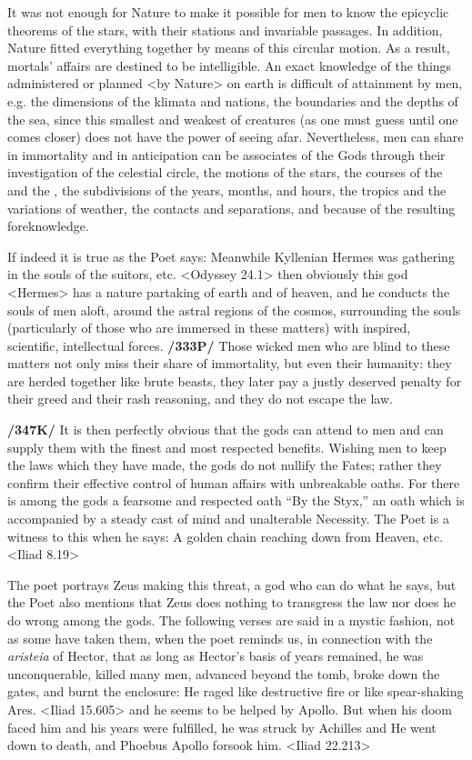 It was not enough for Nature to make it possible for men to know the epicyclic theorems of the stars, with their stations and invariable passages. In addition, Nature fitted everything together by means of this circular motion. As a result, mortals’ affairs are destined to be intelligible. An exact knowledge of the things administered or planned <by Nature> on earth is difficult of attainment by men, e.g. the dimensions of the klimata and nations, the boundaries and the depths of the sea, since this smallest and weakest of creatures (as one must guess until one comes closer) does not have the power of seeing afar. Nevertheless, men can share in immortality and in anticipation can be associates of the Gods through their investigation of the celestial circle, the motions of the stars, the courses of the \Sun\, and the \Moon, the subdivisions of the years, months, and hours, the tropics and the variations of weather, the contacts and separations, and because of the resulting foreknowledge.

If indeed it is true as the Poet says: Meanwhile Kyllenian Hermes was gathering in the souls of the suitors, etc. <Odyssey 24.1> then obviously this god <Hermes> has a nature partaking of earth and of heaven, and he conducts the souls of men aloft, around the astral regions of the cosmos, surrounding the souls (particularly of those who are immersed in these matters) with inspired, scientific, intellectual forces. \textbf{/333P/} Those wicked men who are blind to these matters not only miss their share of immortality, but even their humanity: they are herded together like brute beasts, they later pay a justly deserved penalty for their greed and their rash reasoning, and they do not escape the law.

\textbf{/347K/} It is then perfectly obvious that the gods can attend to men and can supply them with the finest and most respected benefits. Wishing men to keep the laws which they have made, the gods do not nullify the Fates; rather they confirm their effective control of human affairs with unbreakable oaths. For there is among the gods a fearsome and respected oath “By the Styx,” an oath which is accompanied by a steady cast of mind and unalterable Necessity. The Poet is a witness to this when he says: A golden chain reaching down from Heaven, etc. <Iliad 8.19>

The poet portrays Zeus making this threat, a god who can do what he says, but the Poet also mentions that Zeus does nothing to transgress the law nor does he do wrong among the gods. The following verses are said in a mystic fashion, not as some have taken them, when the poet reminds us, in connection with the \textit{aristeia} of Hector, that as long as Hector’s basis of years remained, he was unconquerable, killed many men, advanced beyond the tomb, broke down the gates, and burnt the enclosure: He raged like destructive fire or like spear-shaking Ares. <Iliad 15.605> and he seems to be helped by Apollo. But when his doom faced him and his years were fulfilled, he was struck by Achilles and He went down to death, and Phoebus Apollo forsook him. <Iliad 22.213>

